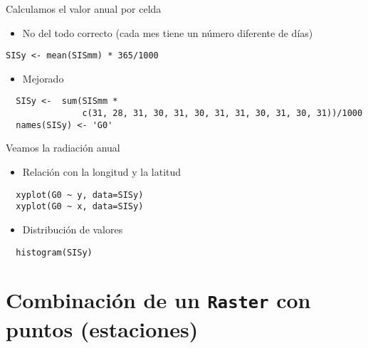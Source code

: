 \documentclass[xcolor={usenames,svgnames,dvipsnames}]{beamer}
\begin{document}
\begin{frame}[fragile,label=sec-2-6]{Calculamos el valor anual por celda}
 \begin{itemize}
\item No del todo correcto (cada mes tiene un número diferente de días)
\end{itemize}
\lstset{language=R,label= ,caption= ,numbers=none}
\begin{lstlisting}
SISy <- mean(SISmm) * 365/1000
\end{lstlisting}
\begin{itemize}
\item Mejorado
\end{itemize}
\lstset{language=R,label= ,caption= ,numbers=none}
\begin{lstlisting}
  SISy <-  sum(SISmm *
               c(31, 28, 31, 30, 31, 30, 31, 31, 30, 31, 30, 31))/1000
  names(SISy) <- 'G0'
\end{lstlisting}
\end{frame}
\begin{frame}[fragile,label=sec-2-7]{Veamos la radiación anual}
 \begin{itemize}
\item Relación con la longitud y la latitud
\end{itemize}
\lstset{language=R,label= ,caption= ,numbers=none}
\begin{lstlisting}
  xyplot(G0 ~ y, data=SISy)
  xyplot(G0 ~ x, data=SISy)
\end{lstlisting}
\begin{itemize}
\item Distribución de valores
\end{itemize}
\lstset{language=R,label= ,caption= ,numbers=none}
\begin{lstlisting}
  histogram(SISy)
\end{lstlisting}
\end{frame}


\section{Combinación de un \texttt{Raster} con puntos (estaciones)}
\label{sec-3}
\end{document}
